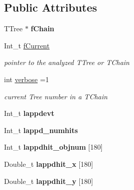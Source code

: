 \subsection*{Public Attributes}
\begin{DoxyCompactItemize}
\item 
\hypertarget{classLAPPDTree_ab7334c305d8c67c1469b286cd775845c}{T\-Tree $\ast$ {\bfseries f\-Chain}}\label{classLAPPDTree_ab7334c305d8c67c1469b286cd775845c}

\item 
\hypertarget{classLAPPDTree_a57ea0164e27a936105e60d5a7910335d}{Int\-\_\-t \hyperlink{classLAPPDTree_a57ea0164e27a936105e60d5a7910335d}{f\-Current}}\label{classLAPPDTree_a57ea0164e27a936105e60d5a7910335d}

\begin{DoxyCompactList}\small\item\em pointer to the analyzed T\-Tree or T\-Chain \end{DoxyCompactList}\item 
\hypertarget{classLAPPDTree_af6c1ba92cb9a0f70418af64563f7bccf}{int \hyperlink{classLAPPDTree_af6c1ba92cb9a0f70418af64563f7bccf}{verbose} =1}\label{classLAPPDTree_af6c1ba92cb9a0f70418af64563f7bccf}

\begin{DoxyCompactList}\small\item\em current Tree number in a T\-Chain \end{DoxyCompactList}\item 
\hypertarget{classLAPPDTree_a3a198c1cfd76e782b371ae2eddc911d7}{Int\-\_\-t {\bfseries lappdevt}}\label{classLAPPDTree_a3a198c1cfd76e782b371ae2eddc911d7}

\item 
\hypertarget{classLAPPDTree_a82b4e313a76045692cad281c966955b8}{Int\-\_\-t {\bfseries lappd\-\_\-numhits}}\label{classLAPPDTree_a82b4e313a76045692cad281c966955b8}

\item 
\hypertarget{classLAPPDTree_a92a142c36821ddf3a0dc240d57ace54f}{Int\-\_\-t {\bfseries lappdhit\-\_\-objnum} \mbox{[}180\mbox{]}}\label{classLAPPDTree_a92a142c36821ddf3a0dc240d57ace54f}

\item 
\hypertarget{classLAPPDTree_a7dbf3acc22501e676eac167d1c8bfb91}{Double\-\_\-t {\bfseries lappdhit\-\_\-x} \mbox{[}180\mbox{]}}\label{classLAPPDTree_a7dbf3acc22501e676eac167d1c8bfb91}

\item 
\hypertarget{classLAPPDTree_a2bc97b493024b71430528a71c2339ec7}{Double\-\_\-t {\bfseries lappdhit\-\_\-y} \mbox{[}180\mbox{]}}\label{classLAPPDTree_a2bc97b493024b71430528a71c2339ec7}


\end{DoxyCompactItemize}
